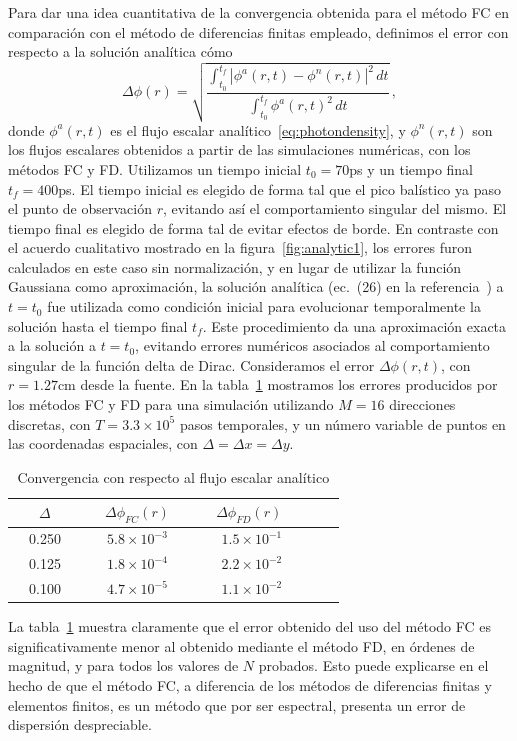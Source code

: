 Para dar una idea cuantitativa de la convergencia obtenida para el método 
FC en comparación con el método de diferencias finitas empleado, 
definimos el error con respecto a la solución analítica cómo
\begin{equation}
\Delta \phi(r)= 
\sqrt{
\frac{ \int_{t_0}^{t_f} |\phi^a(r,t)-\phi^n(r,t)|^2 \,  dt}
{\int_{t_0}^{t_f} \phi^a(r,t)^2 \, dt } 
} \, , 
\end{equation}
donde $\phi^a(r,t)$ es el flujo escalar analítico~\eqref{eq:photondensity}, 
y $\phi^n(r,t)$ son los flujos escalares obtenidos a partir de las 
simulaciones numéricas, con los métodos FC y FD. 
Utilizamos un tiempo inicial $t_0=70$ps y un tiempo final 
$t_f=400$ps. El tiempo inicial es elegido de forma tal que el pico balístico 
ya paso el punto de observación $r$, evitando así el comportamiento 
singular del mismo. El tiempo final es elegido de forma tal 
de evitar efectos de borde. En contraste con el acuerdo 
cualitativo mostrado en la figura~\ref{fig:analytic1}, 
los errores furon calculados en este caso sin normalización, 
y en lugar de utilizar la función Gaussiana como aproximación, 
la solución analítica (ec.~(26) en la referencia~\cite{Paasschens1997}) 
a $t=t_0$ fue utilizada como condición inicial para evolucionar temporalmente 
la solución hasta el tiempo final $t_f$. 
Este procedimiento da una aproximación exacta a la solución a $t=t_0$, 
evitando errores numéricos asociados al comportamiento singular de la función 
delta de Dirac. 
Consideramos el error $\Delta \phi (r,t)$, con $r=1.27$cm desde la fuente. 
En la tabla~\ref{tab:convFCanalytic} mostramos los errores producidos por los métodos FC y FD 
para una simulación utilizando $M=16$ direcciones discretas, con $T=3.3\times 10^5$ 
pasos temporales, y un número variable de puntos en las coordenadas espaciales, 
con $\Delta =\Delta x =\Delta y$.

\begin{table}[h!]
\caption{Convergencia con respecto al flujo escalar analítico} 
\vspace{-0.3cm}
\begin{center}
\begin{tabular}{ccccc}
\hline
  ~~$\Delta$~~  &  ~~$\Delta \phi_{FC}(r)$~~   &   ~~$\Delta \phi_{FD}(r)$ ~~ \\
\hline
 ~~0.250~~   &  ~~$5.8\times 10^{-3}$~~  &  ~~$1.5\times 10^{-1}$~~   \\
 ~~0.125~~   &  ~~$1.8\times 10^{-4}$~~  &  ~~$2.2\times 10^{-2}$~~   \\
 ~~0.100~~   &  ~~$4.7\times 10^{-5}$~~  &  ~~$1.1\times 10^{-2}$~~    \\
\hline
\end{tabular}
\label{tab:convFCanalytic}
\end{center}
\end{table}
La tabla~\ref{tab:convFCanalytic} muestra claramente que el error obtenido 
del uso del método FC es significativamente menor al obtenido mediante el método FD, 
en órdenes de magnitud, y para todos los valores de $N$ probados. 
Esto puede explicarse en el hecho de que el método FC, a diferencia de 
los métodos de diferencias finitas y elementos finitos, es un método que 
por ser espectral, presenta un error de dispersión despreciable.


